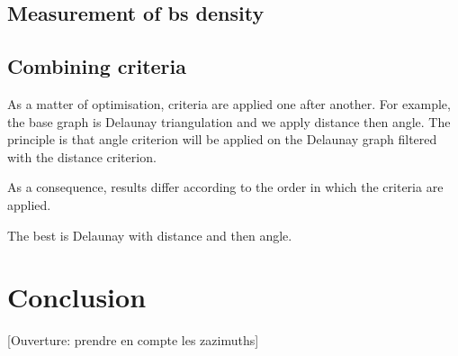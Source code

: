 \documentclass[lettersize,journal,english]{IEEEtran}
\begin{document}
    \subsection{Measurement of \acrshort{bs} density}

    \subsection{Combining criteria}
        As a matter of optimisation, criteria are applied one after another. For example, the base graph is Delaunay triangulation and we apply distance then angle.
        The principle is that angle criterion will be applied on the Delaunay graph filtered with the distance criterion.

        As a consequence, results differ according to the order in which the criteria are applied.

        The best is Delaunay with distance and then angle.



\section{Conclusion}
    [Ouverture: prendre en compte les zazimuths]

\printglossary[type=\acronymtype]
\printglossary



\end{document}
